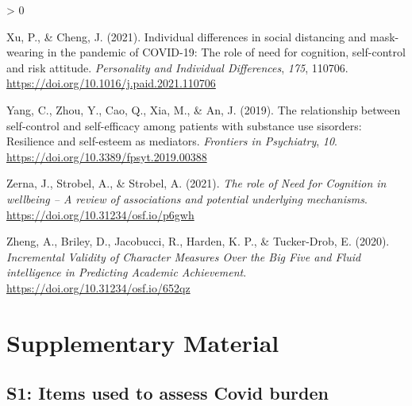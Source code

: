 \documentclass[
  english,
  man,floatsintext]{apa6}
\newlength{\cslhangindent}
\newenvironment{CSLReferences}[2] %
 {%
  \setlength{\parindent}{0pt}
  \ifodd #1 \everypar{\setlength{\hangindent}{\cslhangindent}}\ignorespaces\fi
  \ifnum #2 > 0
  \setlength{\parskip}{#2\baselineskip}
  \fi
 }%
 {}
\begin{document}
\begin{CSLReferences}{1}{0}
\leavevmode\hypertarget{ref-Xu2021}{}%
Xu, P., \& Cheng, J. (2021). Individual differences in social distancing and mask-wearing in the pandemic of {COVID}-19: {The} role of need for cognition, self-control and risk attitude. \emph{Personality and Individual Differences}, \emph{175}, 110706. \url{https://doi.org/10.1016/j.paid.2021.110706}

\leavevmode\hypertarget{ref-Yang2019}{}%
Yang, C., Zhou, Y., Cao, Q., Xia, M., \& An, J. (2019). The relationship between self-control and self-efficacy among patients with substance use sisorders: {R}esilience and self-esteem as mediators. \emph{Frontiers in Psychiatry}, \emph{10}. \url{https://doi.org/10.3389/fpsyt.2019.00388}

\leavevmode\hypertarget{ref-Zerna2021}{}%
Zerna, J., Strobel, A., \& Strobel, A. (2021). \emph{The role of {Need} for {Cognition} in wellbeing -- {A} review of associations and potential underlying mechanisms}. \url{https://doi.org/10.31234/osf.io/p6gwh}

\leavevmode\hypertarget{ref-Zheng2020}{}%
Zheng, A., Briley, D., Jacobucci, R., Harden, K. P., \& Tucker-Drob, E. (2020). \emph{Incremental {Validity} of {Character} {Measures} {Over} the {Big} {Five} and {Fluid} intelligence in {Predicting} {Academic} {Achievement}}. \url{https://doi.org/10.31234/osf.io/652qz}

\end{CSLReferences}

\endgroup

\newpage

\hypertarget{supplementary-material}{%
\section{Supplementary Material}\label{supplementary-material}}

\hypertarget{s1-items-used-to-assess-covid-burden}{%
\subsection{S1: Items used to assess Covid burden}\label{s1-items-used-to-assess-covid-burden}}
\end{document}
